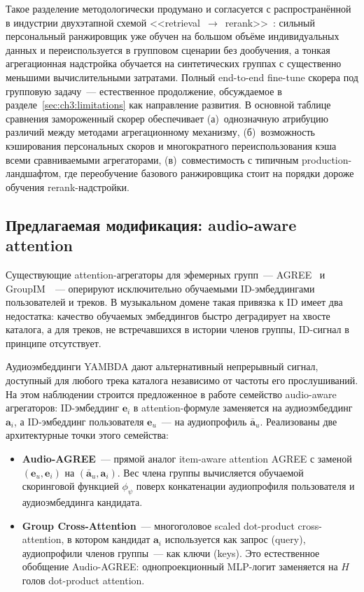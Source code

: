Такое разделение методологически продумано и согласуется с распространённой в индустрии двухэтапной схемой <<retrieval~$\to$~rerank>>~\cite{covington2016youtube, volokitin2023yandex}: сильный персональный ранжировщик уже обучен на большом объёме индивидуальных данных и переиспользуется в групповом сценарии без дообучения, а тонкая агрегационная надстройка обучается на синтетических группах с существенно меньшими вычислительными затратами. Полный end-to-end fine-tune скорера под групповую задачу~--- естественное продолжение, обсуждаемое в разделе~\ref{sec:ch3:limitations} как направление развития. В основной таблице сравнения замороженный скорер обеспечивает (а)~однозначную атрибуцию различий между методами агрегационному механизму, (б)~возможность кэширования персональных скоров и многократного переиспользования кэша всеми сравниваемыми агрегаторами, (в)~совместимость с типичным production-ландшафтом, где переобучение базового ранжировщика стоит на порядки дороже обучения rerank-надстройки.

\subsection{Предлагаемая модификация: audio-aware attention}\label{subsec:ch3:proposal}

Существующие attention-агрегаторы для эфемерных групп~--- AGREE~\cite{cao2018agree} и GroupIM~\cite{sankar2020groupim}~--- оперируют исключительно обучаемыми ID-эмбеддингами пользователей и треков. В музыкальном домене такая привязка к ID имеет два недостатка: качество обучаемых эмбеддингов быстро деградирует на хвосте каталога, а для треков, не встречавшихся в истории членов группы, ID-сигнал в принципе отсутствует.

Аудиоэмбеддинги YAMBDA дают альтернативный непрерывный сигнал, доступный для любого трека каталога независимо от частоты его прослушиваний. На этом наблюдении строится предложенное в работе семейство audio-aware агрегаторов: ID-эмбеддинг $\mathbf{e}_i$ в attention-формуле заменяется на аудиоэмбеддинг $\mathbf{a}_i$, а ID-эмбеддинг пользователя $\mathbf{e}_u$~--- на аудиопрофиль $\bar{\mathbf{a}}_u$. Реализованы две архитектурные точки этого семейства:

\begin{itemize}
    \item \textbf{Audio-AGREE}~--- прямой аналог item-aware attention AGREE с заменой $(\mathbf{e}_u, \mathbf{e}_i)$ на $(\bar{\mathbf{a}}_u, \mathbf{a}_i)$. Вес члена группы вычисляется обучаемой скоринговой функцией $\phi_\psi$ поверх конкатенации аудиопрофиля пользователя и аудиоэмбеддинга кандидата.
    \item \textbf{Group Cross-Attention}~--- многоголовое scaled dot-product cross-attention, в котором кандидат $\mathbf{a}_i$ используется как запрос (query), аудиопрофили членов группы~--- как ключи (keys). Это естественное обобщение Audio-AGREE: однопроекционный MLP-логит заменяется на $H$ голов dot-product attention.
\end{itemize}

